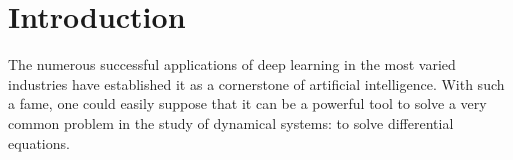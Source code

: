 \chapter{Introduction}\label{ch:intro}







The numerous successful applications of deep learning in the most varied industries \cite{ciregan_multi-column_2012,krizhevsky_imagenet_2012,silver_mastering_2016} have established it as a cornerstone of artificial intelligence.
With such a fame, one could easily suppose that it can be a powerful tool to solve a very common problem in the study of dynamical systems: to solve differential equations.


